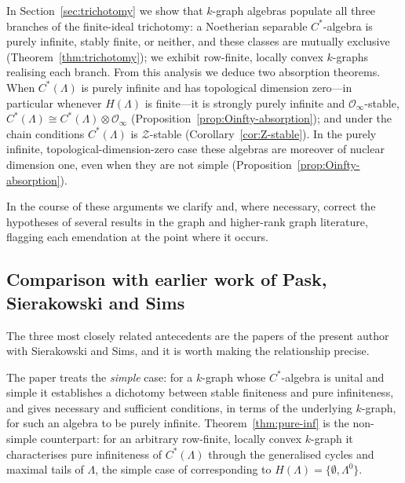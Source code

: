 \documentclass[12pt]{amsart}
\theoremstyle{plain}
\theoremstyle{definition}
\theoremstyle{remark}
\begin{document}
In Section~\ref{sec:trichotomy} we show that $k$-graph algebras populate all
three branches of the finite-ideal trichotomy: a Noetherian separable
$C^*$-algebra is purely infinite, stably finite, or neither, and these classes
are mutually exclusive (Theorem~\ref{thm:trichotomy}); we exhibit row-finite,
locally convex $k$-graphs realising each branch. From this analysis we deduce
two absorption theorems. When $C^*(\Lambda)$ is purely infinite and has
topological dimension zero---in particular whenever $H(\Lambda)$ is
finite---it is strongly purely infinite and $\mathcal O_\infty$-stable,
$C^*(\Lambda)\cong C^*(\Lambda)\otimes\mathcal O_\infty$
(Proposition~\ref{prop:Oinfty-absorption}); and under the chain conditions
$C^*(\Lambda)$ is $\mathcal Z$-stable (Corollary~\ref{cor:Z-stable}). In the
purely infinite, topological-dimension-zero case these algebras are moreover of
nuclear dimension one, even when they are not simple
(Proposition~\ref{prop:Oinfty-absorption}).

In the course of these arguments we clarify and, where necessary, correct the
hypotheses of several results in the graph and higher-rank graph literature,
flagging each emendation at the point where it occurs.

\subsection*{Comparison with earlier work of Pask, Sierakowski and Sims}
The three most closely related antecedents are the papers \cite{PSS2,PSS3,PSS4}
of the present author with Sierakowski and Sims, and it is worth making the
relationship precise.

The paper \cite{PSS3} treats the \emph{simple} case: for a $k$-graph whose
$C^*$-algebra is unital and simple it establishes a dichotomy between stable
finiteness and pure infiniteness, and gives necessary and sufficient
conditions, in terms of the underlying $k$-graph, for such an algebra to be
purely infinite. Theorem~\ref{thm:pure-inf} is the non-simple counterpart:
for an arbitrary row-finite, locally convex $k$-graph it characterises pure
infiniteness of $C^*(\Lambda)$ through the generalised cycles and maximal tails
of $\Lambda$, the simple case of \cite{PSS3} corresponding to
$H(\Lambda)=\{\emptyset,\Lambda^0\}$.
\end{document}
